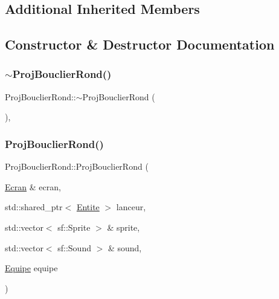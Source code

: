 \subsection*{Additional Inherited Members}


\subsection{Constructor \& Destructor Documentation}
\mbox{\label{class_proj_bouclier_rond_a4cbfae3e14164be2b345efaeac0b3abd}} 
\subsubsection{\texorpdfstring{$\sim$\+Proj\+Bouclier\+Rond()}{~ProjBouclierRond()}}
{\footnotesize\ttfamily Proj\+Bouclier\+Rond\+::$\sim$\+Proj\+Bouclier\+Rond (\begin{DoxyParamCaption}{ }\end{DoxyParamCaption})\hspace{0.3cm}{\ttfamily [inline]}, {\ttfamily [override]}}

\mbox{\label{class_proj_bouclier_rond_ac0ace14849356b453582614a006116b5}} 
\subsubsection{\texorpdfstring{Proj\+Bouclier\+Rond()}{ProjBouclierRond()}}
{\footnotesize\ttfamily Proj\+Bouclier\+Rond\+::\+Proj\+Bouclier\+Rond (\begin{DoxyParamCaption}\item[{\mbox{\hyperlink{class_ecran}{Ecran}} \&}]{ecran,  }\item[{std\+::shared\+\_\+ptr$<$ \mbox{\hyperlink{class_entite}{Entite}} $>$}]{lanceur,  }\item[{std\+::vector$<$ sf\+::\+Sprite $>$ \&}]{sprite,  }\item[{std\+::vector$<$ sf\+::\+Sound $>$ \&}]{sound,  }\item[{\mbox{\hyperlink{constantes_8h_a08fa5554288d5031a8f3bb83cc04ee83}{Equipe}}}]{equipe }\end{DoxyParamCaption})}



